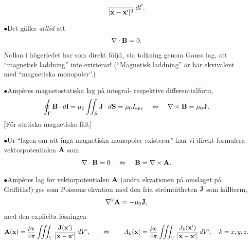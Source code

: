 {{{{{$${          \over{|{\bf x}-{\bf x}'|^3}}\,dl'.
  $$}
\item{$\bullet$}{Det g{\"a}ller {\it alltid} att
  $$
    \nabla\cdot{\bf B}=0.
  $$
  Nollan i h{\"o}gerledet har som direkt f{\"o}ljd, via tolkning genom
  Gauss lag,  att ``magnetisk laddning'' inte existerar! (``Magnetisk
  laddning'' {\"a}r h{\"a}r ekvivalent med ``magnetiska monopoler''.)}
\item{$\bullet$}{Amp{\`e}res magnetostatiska lag p{\aa} integral- respektive
  differentialform,
  $$
    \oint_{\Gamma}{\bf B}\cdot d{\bf l}
      =\mu_0\iint_S{\bf J}\cdot d{\bf S}
      =\mu_0I_{\rm enc}
    \quad\Leftrightarrow\quad
    \nabla\times{\bf B}=\mu_0{\bf J}.
$$[F{\"o}r statiska magnetiska f{\"a}lt]}
\item{$\bullet$}{Ur ``lagen om att inga magnetiska monopoler existerar''
  kan vi direkt formulera vektorpotentialen ${\bf A}$ som
  $$
    \nabla\cdot{\bf B}=0\quad\Leftrightarrow\quad{\bf B}=\nabla\times{\bf A}.
  $$}
\item{$\bullet$}{Amp{\`e}res lag f{\"o}r vektorpotentialen ${\bf A}$ (andra
  ekvationen p{\aa} omslaget p{\aa} Griffiths!) ges som Poissons ekvation
  med den fria str{\"o}mt{\"a}theten ${\bf J}$ som k{\"a}llterm,
  $$
    \nabla^2{\bf A}=-\mu_0{\bf J},
  $$
  med den explicita l{\"o}sningen
  $$
    {\bf A}({\bf x})={{\mu_0}\over{4\pi}}\iiint_V
      {{{\bf J}({\bf x}')}\over{|{\bf x}-{\bf x}'|}}\,dV',
    \qquad\Leftrightarrow\qquad
    A_k({\bf x})={{\mu_0}\over{4\pi}}\iiint_V
      {{J_k({\bf x}')}\over{|{\bf x}-{\bf x}'|}}\,dV',\quad k=x,y,z.
  $$}

}}}}
